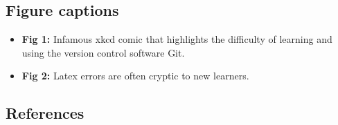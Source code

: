 \documentclass{article}
\begin{document}
\newpage

\hypertarget{figure-captions}{%
\subsection{Figure captions}\label{figure-captions}}

\begin{itemize}
\tightlist
\item
  \textbf{Fig 1:} Infamous xkcd comic that highlights the difficulty of
  learning and using the version control software Git.
\item
  \textbf{Fig 2:} Latex errors are often cryptic to new learners.
\end{itemize}

\newpage
\singlespace
\footnotesize

\hypertarget{references}{%
\subsection*{References}\label{references}}
\end{document}
